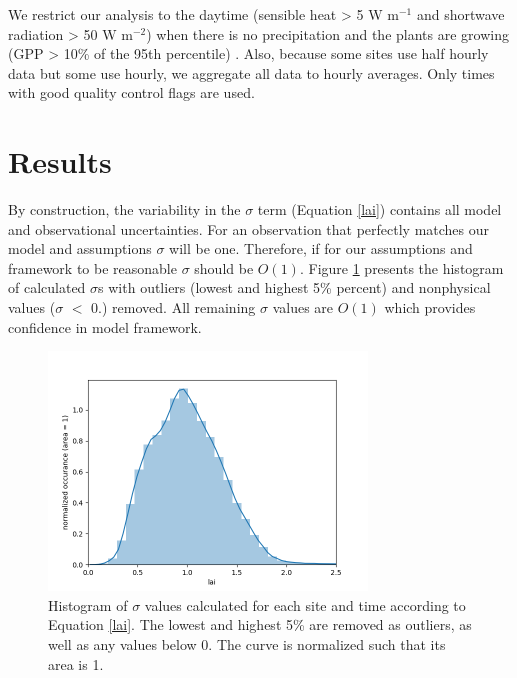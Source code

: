 \documentclass[draft,linenumbers]{agujournal}
\begin{document}
We restrict our analysis to the daytime (sensible heat > 5 W m$^{-1}$ and shortwave radiation > 50 W m$^{-2}$) when there is no precipitation and the plants are growing (GPP > 10\% of the 95th percentile) . Also, because some sites use half hourly data but some use hourly, we aggregate all data to hourly averages. Only times with good quality control flags are used.

\section{Results}
\label{results}

By construction, the variability in the $\sigma$ term (Equation \ref{lai}) contains all model and observational uncertainties. For an observation that perfectly matches our model and assumptions $\sigma$ will be one. Therefore, if for our assumptions and framework to be reasonable $\sigma$ should be $O(1)$. Figure \ref{lai_fig} presents the histogram of calculated $\sigma$s with outliers (lowest and highest 5\% percent) and nonphysical values ($\sigma$ $<$ 0.) removed. All remaining $\sigma$ values are $O(1)$ which provides confidence in model framework.

\begin{figure}[h]
\centering
\includegraphics[width=20pc]{./fig02.png}
\caption{Histogram of $\sigma$ values calculated for each site and time according to Equation \ref{lai}. The lowest and highest 5\% are removed as outliers, as well as any values below 0. The curve is normalized such that its area is 1. }
\label{lai_fig}
\end{figure}
\end{document}
